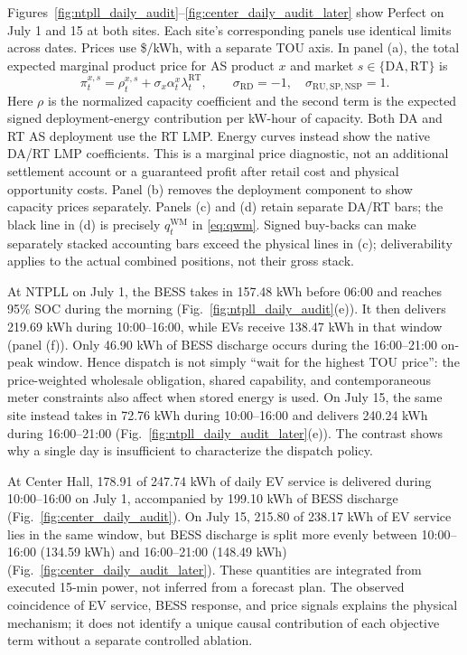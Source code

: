 \documentclass[final,5p,times]{elsarticle}
\newcommand{\DA}{\mathrm{DA}}
\newcommand{\RT}{\mathrm{RT}}
\newcommand{\RU}{\mathrm{RU}}
\newcommand{\RD}{\mathrm{RD}}
\newcommand{\SP}{\mathrm{SP}}
\newcommand{\NSP}{\mathrm{NSP}}
\newcommand{\WM}{\mathrm{WM}}
\begin{document}
Figures~\ref{fig:ntpll_daily_audit}--\ref{fig:center_daily_audit_later}
show Perfect on July 1 and 15 at both sites. Each site's corresponding panels
use identical limits across dates. Prices use \$/kWh, with a separate TOU
axis. In panel (a), the total expected marginal product price for AS product $x$ and
market $s\in\{\DA,\RT\}$ is
\begin{equation}
\pi_t^{x,s}=\rho_t^{x,s}+\sigma_x\alpha_t^x\lambda_t^{\RT},
\qquad \sigma_{\RD}=-1,\quad \sigma_{\RU,\SP,\NSP}=1.
\label{eq:expected_product_price}
\end{equation}
Here $\rho$ is the normalized capacity coefficient and the second term is the
expected signed deployment-energy contribution per kW-hour of capacity. Both
DA and RT AS deployment use the RT LMP. Energy curves instead show the native
DA/RT LMP coefficients. This is a marginal price diagnostic, not an additional
settlement account or a guaranteed profit after retail cost and physical
opportunity costs. Panel (b) removes the deployment component to show capacity
prices separately. Panels (c) and (d) retain separate DA/RT bars; the black
line in (d) is precisely $q_t^{\WM}$ in \eqref{eq:qwm}. Signed buy-backs can
make separately stacked accounting bars exceed the physical lines in (c);
deliverability applies to the actual combined positions, not their gross stack.

At NTPLL on July 1, the BESS takes in 157.48 kWh before 06:00 and reaches
95\% SOC during the morning (Fig.~\ref{fig:ntpll_daily_audit}(e)). It then
delivers 219.69 kWh during 10:00--16:00, while EVs receive 138.47 kWh in
that window (panel (f)). Only 46.90 kWh of BESS discharge occurs during the
16:00--21:00 on-peak window. Hence dispatch is not simply ``wait for the
highest TOU price'': the price-weighted wholesale obligation, shared capability,
and contemporaneous meter constraints also affect when stored energy is used.
On July 15, the same site instead takes in 72.76 kWh during 10:00--16:00
and delivers 240.24 kWh during 16:00--21:00
(Fig.~\ref{fig:ntpll_daily_audit_later}(e)). The contrast shows why a single
day is insufficient to characterize the dispatch policy.

At Center Hall, 178.91 of 247.74 kWh of daily EV service is delivered during
10:00--16:00 on July 1, accompanied by 199.10 kWh of BESS discharge
(Fig.~\ref{fig:center_daily_audit}). On July 15, 215.80 of 238.17 kWh of
EV service lies in the same window, but BESS discharge is split more evenly
between 10:00--16:00 (134.59 kWh) and 16:00--21:00 (148.49 kWh)
(Fig.~\ref{fig:center_daily_audit_later}). These quantities are integrated
from executed 15-min power, not inferred from a forecast plan. The observed
coincidence of EV service, BESS response, and price signals explains the
physical mechanism; it does not identify a unique causal contribution of each
objective term without a separate controlled ablation.
\end{document}
